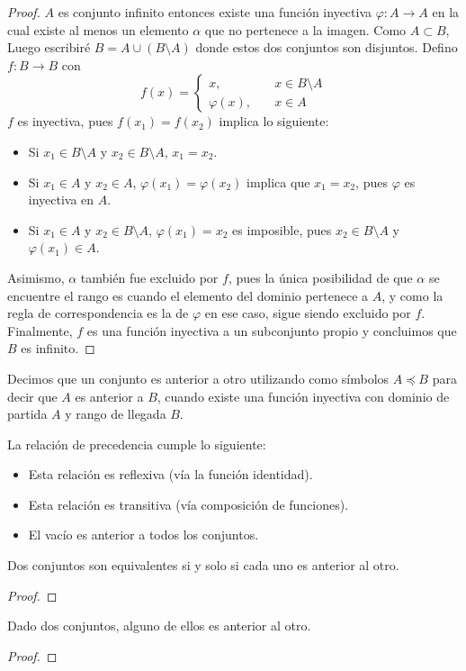 \documentclass[main.tex]{subfiles}
\begin{document}
\begin{proof}
    $A$ es conjunto infinito entonces existe una funci\'on inyectiva $\varphi: A \to A$ en la cual existe al menos un elemento $\alpha$ que no pertenece a la imagen. Como $A \subset B$, Luego escribir\'e $B = A \cup (B \setminus A)$ donde estos dos conjuntos son disjuntos. Defino $f: B \to B$ con
    \[
        f(x) = 
        \begin{cases}
            x, &\quad x \in B \setminus A \\
            \varphi(x), &\quad x \in A
        \end{cases}
    \]
    $f$ es inyectiva, pues $f(x_1) = f(x_2)$ implica lo siguiente:
    \begin{itemize}
        \item Si $x_1 \in B \setminus A$ y $x_2 \in B \setminus A$, $x_1 = x_2$.
        \item Si $x_1 \in A$ y $x_2 \in A$, $\varphi(x_1) = \varphi(x_2)$ implica que $x_1 = x_2$, pues $\varphi$ es inyectiva en $A$.
        \item Si $x_1 \in A$ y $x_2 \in B \setminus A$, $\varphi(x_1) = x_2$ es imposible, pues $x_2 \in B \setminus A$ y $\varphi(x_1) \in A$.
    \end{itemize}
    Asimismo, $\alpha$ tambi\'en fue excluido por $f$, pues la \'unica posibilidad de que $\alpha$ se encuentre el rango es cuando el elemento del dominio pertenece a $A$, y como la regla de correspondencia es la de $\varphi$ en ese caso, sigue siendo excluido por $f$. Finalmente, $f$ es una funci\'on inyectiva a un subconjunto propio y concluimos que $B$ es infinito.
\end{proof}

\begin{defn}
    Decimos que un conjunto es anterior a otro utilizando como s\'imbolos $A \preceq B$ para decir que $A$ es anterior a $B$, cuando existe una funci\'on inyectiva con dominio de partida $A$ y rango de llegada $B$.
\end{defn}

\begin{remark}
    La relaci\'on de precedencia cumple lo siguiente:
    \begin{itemize}
        \item Esta relaci\'on es reflexiva (v\'ia la funci\'on identidad).
        \item Esta relaci\'on es transitiva (v\'ia composici\'on de funciones).
        \item El vac\'io es anterior a todos los conjuntos.
    \end{itemize}
\end{remark}

\begin{theorem}
    Dos conjuntos son equivalentes si y solo si cada uno es anterior al otro.
\end{theorem}

\begin{proof}

\end{proof}

\begin{theorem}
    Dado dos conjuntos, alguno de ellos es anterior al otro.
\end{theorem}

\begin{proof}

\end{proof}
\end{document}

